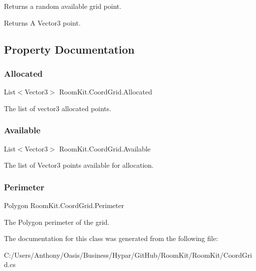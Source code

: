 Returns a random available grid point. 

\begin{DoxyReturn}{Returns}
A Vector3 point. 
\end{DoxyReturn}


\subsection{Property Documentation}
\mbox{\label{class_room_kit_1_1_coord_grid_a4b516a308b2c0c8cea57e9b1bc8484b0}} 
\subsubsection{\texorpdfstring{Allocated}{Allocated}}
{\footnotesize\ttfamily List$<$Vector3$>$ Room\+Kit.\+Coord\+Grid.\+Allocated\hspace{0.3cm}{\ttfamily [get]}}



The list of vector3 allocated points. 

\mbox{\label{class_room_kit_1_1_coord_grid_ad8a24424728e02b5a8693a1be8b2155e}} 
\subsubsection{\texorpdfstring{Available}{Available}}
{\footnotesize\ttfamily List$<$Vector3$>$ Room\+Kit.\+Coord\+Grid.\+Available\hspace{0.3cm}{\ttfamily [get]}}



The list of Vector3 points available for allocation. 

\mbox{\label{class_room_kit_1_1_coord_grid_a3699e8b4c72626d50c589b900c796260}} 
\subsubsection{\texorpdfstring{Perimeter}{Perimeter}}
{\footnotesize\ttfamily Polygon Room\+Kit.\+Coord\+Grid.\+Perimeter\hspace{0.3cm}{\ttfamily [get]}}



The Polygon perimeter of the grid. 



The documentation for this class was generated from the following file\+:\begin{DoxyCompactItemize}
\item 
C\+:/\+Users/\+Anthony/\+Oasis/\+Business/\+Hypar/\+Git\+Hub/\+Room\+Kit/\+Room\+Kit/Coord\+Grid.\+cs\end{DoxyCompactItemize}
